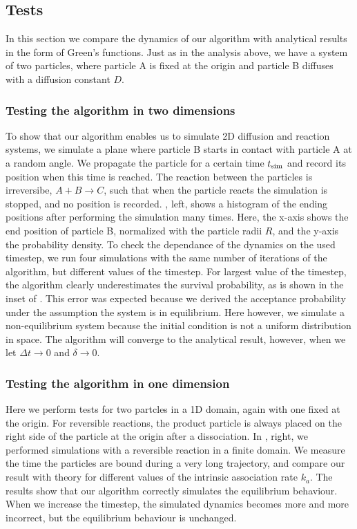 \subsection{Tests}
In this section we compare the dynamics of our algorithm with analytical results in the form of Green's functions. Just as in the analysis above, we have a system of two particles, where particle A is fixed at the origin and particle B diffuses with a diffusion constant $D$. 

\subsubsection{Testing the algorithm in two dimensions}
To show that our algorithm enables us to simulate 2D diffusion and reaction systems, we simulate a plane where particle B starts in contact with particle A at a random angle. We propagate the particle for a certain time $t_{\rm sim}$ and record its position when this time is reached. The reaction between the particles is irreversibe, $A + B \to C$, such that when the particle reacts the simulation is stopped, and no position is recorded. , left, shows a histogram of the ending positions after performing the simulation many times. Here, the x-axis shows the end position of particle B, normalized with the particle radii $R$, and the y-axis the probability density. To check the dependance of the dynamics on the used timestep, we run four simulations with the same number of iterations of the algorithm, but different values of the timestep. For largest value of the timestep, the algorithm clearly underestimates the survival probability, as is shown in the inset of . This error was expected because we derived the acceptance probability under the assumption the system is in equilibrium. Here however, we simulate a non-equilibrium system because the initial condition is not a uniform distribution in space. The algorithm will converge to the analytical result, however, when we let $\Delta t \to 0$ and $\delta \to 0$.

\subsubsection{Testing the algorithm in one dimension}
Here we perform tests for two partcles in a 1D domain, again with one fixed at the origin. For reversible reactions, the product particle is always placed on the right side of the particle at the origin after a dissociation. In , right, we performed simulations with a reversible reaction in a finite domain. We measure the time the particles are bound during a very long trajectory, and compare our result with theory for different values of the intrinsic association rate $k_a$. The results show that our algorithm correctly simulates the equilibrium behaviour. When we increase the timestep, the simulated dynamics becomes more and more incorrect, but the equilibrium behaviour is unchanged.

